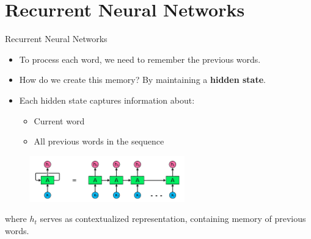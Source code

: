 \documentclass[serif, aspectratio=169]{beamer}
\begin{document}
\section{Recurrent Neural Networks}

\begin{frame}{Recurrent Neural Networks}
	\begin{itemize}
		\item To process each word, we need to remember the previous words.
		\item How do we create this memory? By maintaining a \textbf{hidden state}.
		\item Each hidden state captures information about:
		\begin{itemize}
			\item Current word
			\item All previous words in the sequence
		\end{itemize}
	\end{itemize}
	
	
	\begin{figure}
		\centering
		\includegraphics[width=0.6\textwidth]{pic/image-RNN.png}
		\label{fig:image-RNN}
	\end{figure}
	
	\begin{center}
		where $h_t$ serves as contextualized representation, containing memory of previous words.
	\end{center}
	
\end{frame}
\end{document}
